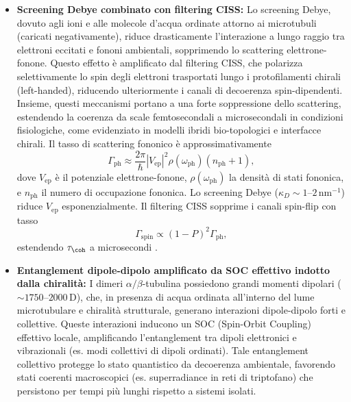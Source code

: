 \documentclass[11pt,a4paper]{article}
\let\oldcite\cite
\renewcommand{\cite}{\protect\oldcite}
\theoremstyle{plain}
\theoremstyle{definition}
\begin{document}
\begin{itemize}
    \item \textbf{Screening Debye combinato con filtering CISS:}  
    Lo screening Debye, dovuto agli ioni e alle molecole d'acqua ordinate attorno ai microtubuli (caricati negativamente), riduce drasticamente l'interazione a lungo raggio tra elettroni eccitati e fononi ambientali, sopprimendo lo scattering elettrone-fonone. Questo effetto è amplificato dal filtering CISS, che polarizza selettivamente lo spin degli elettroni trasportati lungo i protofilamenti chirali (left-handed), riducendo ulteriormente i canali di decoerenza spin-dipendenti. Insieme, questi meccanismi portano a una forte soppressione dello scattering, estendendo la coerenza da scale femtosecondali a microsecondali in condizioni fisiologiche, come evidenziato in modelli ibridi bio-topologici e interfacce chirali. Il tasso di scattering fononico è approssimativamente
    \begin{equation}
    \Gamma_{\mathrm{ph}} \approx \frac{2\pi}{\hbar} |V_{\mathrm{ep}}|^2 \rho(\omega_{\mathrm{ph}}) (n_{\mathrm{ph}} + 1),
    \label{eq:phonon_scattering}
    \end{equation}
    dove $V_{\mathrm{ep}}$ è il potenziale elettrone-fonone, $\rho(\omega_{\mathrm{ph}})$ la densità di stati fononica, e $n_{\mathrm{ph}}$ il numero di occupazione fononica. Lo screening Debye ($\kappa_D \sim 1$--$2\,\mathrm{nm}^{-1}$) riduce $V_{\mathrm{ep}}$ esponenzialmente. Il filtering CISS sopprime i canali spin-flip con tasso
    \begin{equation}
    \Gamma_{\mathrm{spin}} \propto (1 - P)^2 \Gamma_{\mathrm{ph}},
    \label{eq:spin_flip_rate}
    \end{equation}
    estendendo $\tau_{\coh}$ a microsecondi \cite{naaman2019spin, naaman2020spin, kumar2026ciss, sala2026spin}.

    \item \textbf{Entanglement dipole-dipolo amplificato da SOC effettivo indotto dalla chiralità:}  
    I dimeri $\alpha/\beta$-tubulina possiedono grandi momenti dipolari ($\sim 1750$--$2000\,\mathrm{D}$), che, in presenza di acqua ordinata all'interno del lume microtubulare e chiralità strutturale, generano interazioni dipole-dipolo forti e collettive. Queste interazioni inducono un SOC (Spin-Orbit Coupling) effettivo locale, amplificando l'entanglement tra dipoli elettronici e vibrazionali (es. modi collettivi di dipoli ordinati). Tale entanglement collettivo protegge lo stato quantistico da decoerenza ambientale, favorendo stati coerenti macroscopici (es. superradiance in reti di triptofano) che persistono per tempi più lunghi rispetto a sistemi isolati. 
    

\end{itemize}
\end{document}
